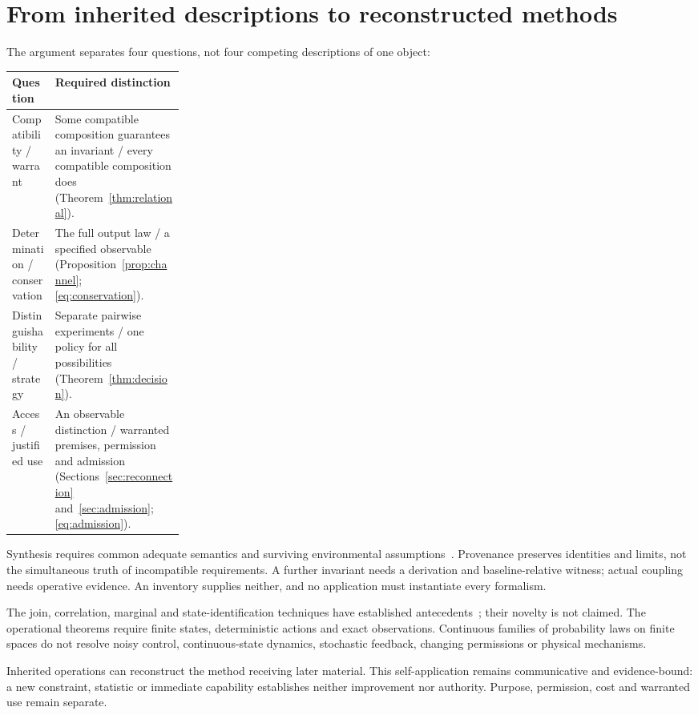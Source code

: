 \documentclass[11pt]{article}
\begin{document}
\section{From inherited descriptions to reconstructed methods}\label{sec:conclusion}
The argument separates four questions, not four competing descriptions of one object:
\begin{center}
\begin{tabularx}{\linewidth}{@{}>{\raggedright\arraybackslash}p{0.25\linewidth}X@{}}
\toprule
Question & Required distinction\\\midrule
Compatibility / warrant & Some compatible composition guarantees an invariant / every compatible composition does (Theorem~\ref{thm:relational}).\\[2pt]
Determination / conservation & The full output law / a specified observable (Proposition~\ref{prop:channel}; \eqref{eq:conservation}).\\[2pt]
Distinguishability / strategy & Separate pairwise experiments / one policy for all possibilities (Theorem~\ref{thm:decision}).\\[2pt]
Access / justified use & An observable distinction / warranted premises, permission and admission (Sections~\ref{sec:reconnection} and~\ref{sec:admission}; \eqref{eq:admission}).\\
\bottomrule
\end{tabularx}
\end{center}

Synthesis requires common adequate semantics and surviving environmental assumptions~\cite{abadi}. Provenance preserves identities and limits, not the simultaneous truth of incompatible requirements. A further invariant needs a derivation and baseline-relative witness; actual coupling needs operative evidence. An inventory supplies neither, and no application must instantiate every formalism.

The join, correlation, marginal and state-identification techniques have established antecedents~\cite{beeri,schneidman,vorobev,bos}; their novelty is not claimed. The operational theorems require finite states, deterministic actions and exact observations. Continuous families of probability laws on finite spaces do not resolve noisy control, continuous-state dynamics, stochastic feedback, changing permissions or physical mechanisms.

Inherited operations can reconstruct the method receiving later material. This self-application remains communicative and evidence-bound: a new constraint, statistic or immediate capability establishes neither improvement nor authority. Purpose, permission, cost and warranted use remain separate.
\end{document}
